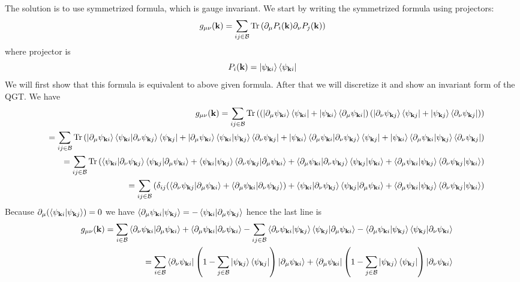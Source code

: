 \documentclass[onecolumn, prb,preprintnumbers,amsmath,amssymb,floatfix]{revtex4}
\newcommand{\vk}{{\mathbf{k}}}
\newcommand{\Tr}{\mathrm{Tr}} \newcommand{\npsi}{\underline{\psi}}
\newcommand{\cb}{{\cal B}}
\begin{document}
The solution is to use symmetrized formula, which is gauge invariant.
We start by writing the symmetrized formula using projectors:
\begin{eqnarray}
g_{\mu\nu}(\vk)  =  \sum_{i j \in\cb}\Tr\left(\partial_\mu P_i(\vk) \partial_\nu P_j(\vk) \right)
\label{Eq:26}
\end{eqnarray}  
where projector is
$$P_i(\vk) =\ket{\psi_{\vk i}}\bra{\psi_{\vk i}}$$
We will first show that this formula is equivalent to above given
formula. After that we will discretize it and show an invariant form
of the QGT.
We have
\begin{eqnarray}
&&  g_{\mu\nu}(\vk)  =  \sum_{i j \in\cb}\Tr\left(
  \left(\ket{\partial_\mu \psi_{\vk i}}\bra{\psi_{\vk i}}+\ket{\psi_{\vk i}}\bra{\partial_\mu \psi_{\vk i}}\right)
  \left(\ket{\partial_\nu \psi_{\vk j}}\bra{\psi_{\vk j}} +\ket{\psi_{\vk j}}\bra{\partial_\nu\psi_{\vk j}}\right)
  \right)\\
 && =
\sum_{ij\in\cb}\Tr\left(
  \ket{\partial_\mu \psi_{\vk i}}\braket{\psi_{\vk i} |\partial_\nu \psi_{\vk j}}\bra{\psi_{\vk j}} 
  +\ket{\partial_\mu \psi_{\vk i}}\braket{\psi_{\vk i}|\psi_{\vk j}}\bra{\partial_\nu\psi_{\vk j}}
  +\ket{\psi_{\vk i}}\braket{\partial_\mu \psi_{\vk i}|\partial_\nu \psi_{\vk j}}\bra{\psi_{\vk j}}
  +\ket{\psi_{\vk i}}\braket{\partial_\mu \psi_{\vk i}|\psi_{\vk j}}\bra{\partial_\nu\psi_{\vk j}}
  \right)
    \nonumber\\
  &&=
\sum_{ij\in\cb}\Tr\left(
  \braket{\psi_{\vk i} |\partial_\nu \psi_{\vk j}}\braket{\psi_{\vk j}|\partial_\mu \psi_{\vk i}}
  +\braket{\psi_{\vk i}|\psi_{\vk j}}\braket{\partial_\nu\psi_{\vk j}|\partial_\mu \psi_{\vk i}}
  +\braket{\partial_\mu \psi_{\vk i}|\partial_\nu \psi_{\vk j}}\braket{\psi_{\vk j}|\psi_{\vk i}}
  +\braket{\partial_\mu \psi_{\vk i}|\psi_{\vk j}}\braket{\partial_\nu\psi_{\vk j}|\psi_{\vk i}}
     \right)\nonumber\\
  &&=\sum_{ij\in\cb}\left(
    \delta_{ij} (\braket{\partial_\nu\psi_{\vk j}|\partial_\mu \psi_{\vk i}}+\braket{\partial_\mu \psi_{\vk i}|\partial_\nu \psi_{\vk j}})
  + \braket{\psi_{\vk i} |\partial_\nu \psi_{\vk j}}\braket{\psi_{\vk j}|\partial_\mu \psi_{\vk i}}
  + \braket{\partial_\mu \psi_{\vk i}|\psi_{\vk j}}\braket{\partial_\nu\psi_{\vk j}|\psi_{\vk i}}
     \right)\nonumber
 \end{eqnarray}
Because $\partial_\mu (\braket{\psi_{\vk i}|\psi_{\vk j}})=0$ we have
$\braket{\partial_\mu\psi_{\vk i}|\psi_{\vk j}}=-\braket{\psi_{\vk i}|\partial_\mu\psi_{\vk j}}$
hence the last line is
\begin{eqnarray}
  &&  g_{\mu\nu}(\vk)  =\sum_{i\in\cb}   \braket{\partial_\nu\psi_{\vk i}|\partial_\mu \psi_{\vk i}}+\braket{\partial_\mu \psi_{\vk i}|\partial_\nu \psi_{\vk i}}
-\sum_{ij\in\cb}\braket{\partial_\nu\psi_{\vk i} | \psi_{\vk j}}\braket{\psi_{\vk j}|\partial_\mu \psi_{\vk i}}
-\braket{\partial_\mu \psi_{\vk i}|\psi_{\vk j}}\braket{\psi_{\vk j}|\partial_\nu\psi_{\vk i}}\\
  &&=\sum_{i\in\cb}
     \braket{\partial_\nu\psi_{\vk i}|\left(1-\sum_{j\in\cb} \ket{\psi_{\vk j}}\bra{\psi_{\vk j}}\right)|\partial_\mu \psi_{\vk i}}
   +\braket{\partial_\mu \psi_{\vk i}|\left(1-\sum_{j\in\cb}\ket{\psi_{\vk j}}\bra{\psi_{\vk j}}\right)|\partial_\nu \psi_{\vk i}}
\end{eqnarray}     
\end{document}
